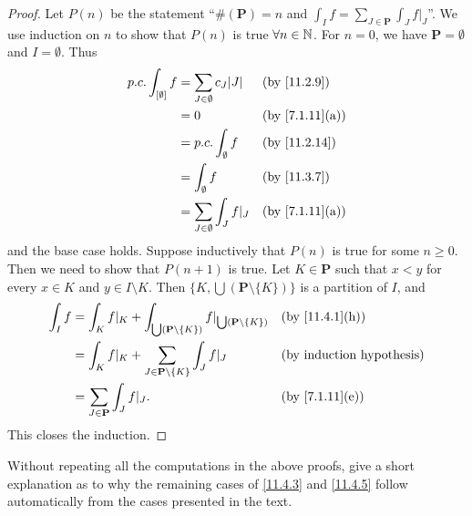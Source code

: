 \begin{proof}
  Let \(P(n)\) be the statement ``\(\#(\mathbf{P}) = n\) and \(\int_I f = \sum_{J \in \mathbf{P}} \int_J f|_J\)''.
  We use induction on \(n\) to show that \(P(n)\) is true \(\forall n \in \mathbb{N}\).
  For \(n = 0\), we have \(\mathbf{P} = \emptyset\) and \(I = \emptyset\).
  Thus
  \begin{align*}
    p.c. \int_{[\emptyset]} f & = \sum_{J \in \emptyset} c_J \abs{J} &  & \text{(by \cref{11.2.9})}    \\
                              & = 0                                  &  & \text{(by \cref{7.1.11}(a))} \\
                              & = p.c. \int_{\emptyset} f            &  & \text{(by \cref{11.2.14})}   \\
                              & = \int_{\emptyset} f                 &  & \text{(by \cref{11.3.7})}    \\
                              & = \sum_{J \in \emptyset} \int_J f|_J &  & \text{(by \cref{7.1.11}(a))}
  \end{align*}
  and the base case holds.
  Suppose inductively that \(P(n)\) is true for some \(n \geq 0\).
  Then we need to show that \(P(n + 1)\) is true.
  Let \(K \in \mathbf{P}\) such that \(x < y\) for every \(x \in K\) and \(y \in I \setminus K\).
  Then \(\big\{K, \bigcup (\mathbf{P} \setminus \{K\})\big\}\) is a partition of \(I\), and
  \begin{align*}
    \int_I f & = \int_K f|_K + \int_{\bigcup (\mathbf{P} \setminus \{K\})} f|_{\bigcup (\mathbf{P} \setminus \{K\})} &  & \text{(by \cref{11.4.1}(h))} \\
             & = \int_K f|_K + \sum_{J \in \mathbf{P} \setminus \{K\}} \int_J f|_J                                   &  & \byIH                        \\
             & = \sum_{J \in \mathbf{P}} \int_J f|_J.                                                                &  & \text{(by \cref{7.1.11}(e))}
  \end{align*}
  This closes the induction.
\end{proof}

\begin{ex}\label{ex:11.4.4}
  Without repeating all the computations in the above proofs, give a short explanation as to why the remaining cases of \cref{11.4.3} and \cref{11.4.5} follow automatically from the cases presented in the text.
\end{ex}

